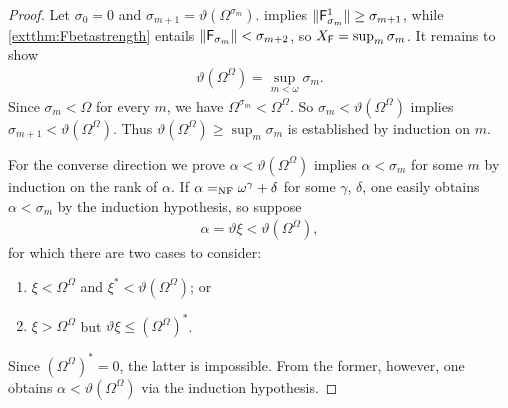 \documentclass[UKenglish,cleveref,DIV=12]{scrartcl}
\theoremstyle{definition}
\theoremstyle{definition}
\begin{document}
\begin{proof}
Let $\sigma_0=0$ and $\sigma_{m+1}=\vartheta(\Omega^{\sigma_m})$.  implies $\lVert{\mathsf{F}_{\sigma_m}^1}\rVert\ge\sigma_{m+1}$, while \cref{extthm:Fbetastrength} entails $\lVert{\mathsf{F}_{\sigma_m}}\rVert<\sigma_{m+2}$, so $X_{\mathsf{F}}=\sup_m\sigma_m$. It remains to show
\begin{align*}
 \vartheta(\Omega^\Omega)=\sup_{m<\omega}\sigma_m.
\end{align*}
Since ${\sigma_m}<\Omega$ for every $m$, we have $\Omega^{\sigma_m}<\Omega^\Omega$.
So $\sigma_m<\vartheta(\Omega^\Omega)$ implies
$\sigma_{m+1}<\vartheta(\Omega^\Omega)$. Thus
$\vartheta(\Omega^\Omega)\ge\sup_m\sigma_m$ is established by induction on $m$.

For the converse direction we prove $\alpha<\vartheta(\Omega^\Omega)$ implies
$\alpha<\sigma_m$ for some $m$ by induction on the rank of $\alpha$. If
$\alpha=_{\mathrm{NF}}\omega^\gamma+\delta$ for some $\gamma$, $\delta$, one easily obtains
$\alpha<\sigma_m$ by the induction hypothesis, so suppose
\begin{align*}
 \alpha=\vartheta\xi<\vartheta(\Omega^\Omega),
\end{align*}
for which there are two cases to consider:
\begin{enumerate}
 \item $\xi<\Omega^\Omega$ and $\xi^*<\vartheta(\Omega^\Omega)$; or
 \item $\xi>\Omega^\Omega$ but $\vartheta\xi\le(\Omega^\Omega)^*$.
\end{enumerate}
Since $(\Omega^\Omega)^*=0$, the latter is impossible. From the former, however, one obtains $\alpha<\vartheta(\Omega^\Omega)$ via the induction
hypothesis.
\end{proof}
\end{document}

